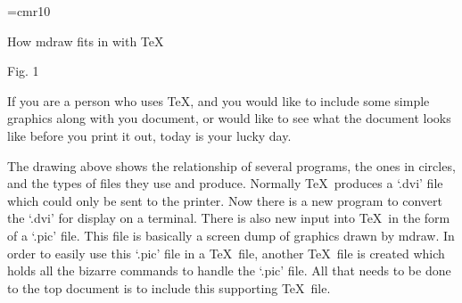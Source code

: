 \font\romannormal=cmr10
 
\romanlarge
\centerline{How mdraw fits in with \TeX}
\smallskip
\romannormal
\centerline{ }
\centerline{Fig. 1}
\medskip
If you are a person who uses \TeX , and you would like to include some simple
graphics along with you document, or would like to see what the document looks
like before you print it out, today is your lucky day.

The drawing above shows the relationship of several programs, the ones in
circles, and the types of files they use and produce. Normally \TeX\ produces a
`.dvi' file which could only be sent to the printer. Now there is a new program
to convert the `.dvi' for display on a terminal. There is also new input into
\TeX\ in the form of a `.pic' file. This file is basically a screen dump of
graphics drawn by mdraw. In order to easily use this `.pic' file in a \TeX\
file, another \TeX\ file is created which holds all the bizarre commands to 
handle the `.pic' file. All that needs to be done to the top document is 
to include this supporting \TeX\ file. 
\bye
